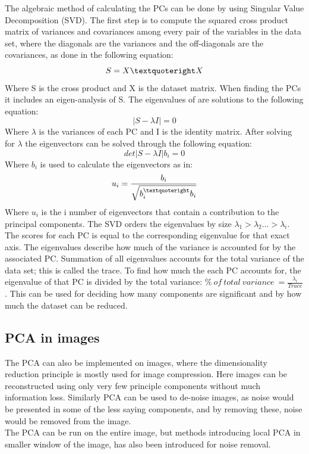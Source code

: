 The algebraic method of calculating the PCs can be done by using Singular Value Decomposition (SVD). The first step is to compute the squared cross product matrix of variances and covariances among every pair of the variables in the data set, where the diagonals are the variances and the off-diagonals are the covariances, as done in the following equation:
\begin{equation}
S = X \textquoteright X
\end{equation}
Where S is the cross product and X is the dataset matrix. When finding the PCs it includes an eigen-analysis of S. The eigenvalues of are solutions to the following equation:
\begin{equation}
| S - \lambda I |  = 0
\end{equation}
Where $\lambda$ is the variances of each PC and I is the identity matrix. After solving for $\lambda$ the eigenvectors can be solved through the following equation:
\begin{equation}
det | S - \lambda I | b_{i} = 0
\end{equation}
Where $b_{i}$ is used to calculate the eigenvectors as in:
\begin{eqnarray}
u_{i} = \frac{b_{i}}{\sqrt{b_{i}^{\textquoteright} b_{i}}}
\end{eqnarray}
Where $u_{i}$ is the i number of eigenvectors that contain a contribution to the principal components.
The SVD orders the eigenvalues by size $\lambda_{1} > \lambda_{2} … > \lambda_{i}$. The scores for each PC is equal to the corresponding eigenvalue for that exact axis. The eigenvalues describe how much of the variance is accounted for by the associated PC. Summation of all eigenvalues accounts for the total variance of the data set; this is called the trace. To find how much the each PC accounts for, the eigenvalue of that PC is divided by the total variance: $\%~ of~ total~ variance~ = \frac{\lambda_{i}}{Trace}$. This can be used for deciding how many components are significant and by how much the dataset can be reduced. \cite{Semmlow2004}

\subsection{PCA in images}

The PCA can also be implemented on images, where the dimensionality reduction principle is mostly used for image compression. Here images can be reconstructed using only very few principle components without much information loss. Similarly PCA can be used to de-noise images, as noise would be presented in some of the less saying components, and by removing these, noise would be removed from the image. \\
The PCA can be run on the entire image, but methods introducing local PCA in smaller window of the image, has also been introduced for noise removal. \cite{MuraliMohanBabu2012}   


